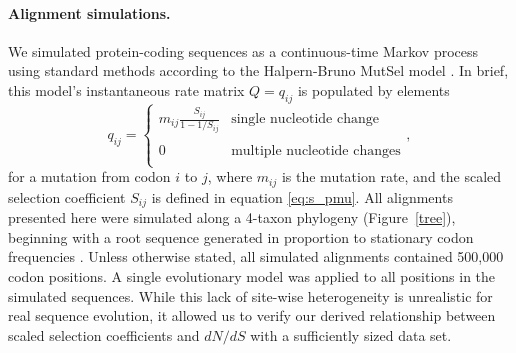\documentclass{pnastwo}
\begin{document}
\begin{article}
\paragraph{Alignment simulations.}
We simulated protein-coding sequences as a continuous-time Markov process using standard methods \cite{Yang2006} according to the Halpern-Bruno MutSel model \cite{HalpernBruno1998}. In brief, this model's instantaneous rate matrix $Q = q_{ij}$ is populated by elements
\begin{equation}\label{eq:HBmatrix}
q_{ij} = \left\{ 
\begin{array}{rl}
m_{ij} \frac{S_{ij}}{1-1/S_{ij}} &\text{single nucleotide change} \\\\
0                                  &\text{multiple nucleotide changes} \\             
\end{array} \right.,
\end{equation} for a mutation from codon $i$ to $j$, where $m_{ij}$ is the mutation rate, and the scaled selection coefficient $S_{ij}$ is defined in equation \eqref{eq:s_pmu}. All alignments presented here were simulated along a 4-taxon phylogeny (Figure~\ref{tree}), beginning with a root sequence generated in proportion to  stationary codon frequencies \cite{Yang2006}. Unless otherwise stated, all simulated alignments contained 500,000 codon positions. A single evolutionary model was applied to all positions in the simulated sequences. While this lack of site-wise heterogeneity is unrealistic for real sequence evolution, it allowed us to verify our derived relationship between scaled selection coefficients and $dN/dS$ with a sufficiently sized data set. 


\end{article}
\end{document}
